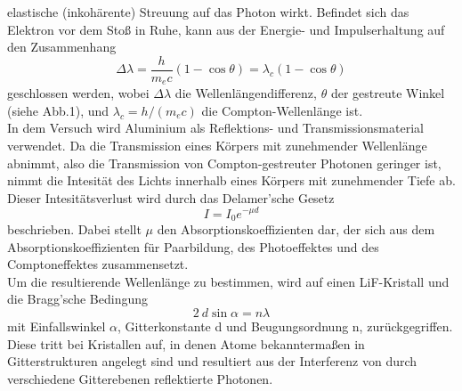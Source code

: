     elastische (inkohärente) Streuung auf das Photon wirkt. Befindet sich das Elektron 
    vor dem Stoß in Ruhe, kann aus der Energie- und Impulserhaltung auf den Zusammenhang
    \begin{equation*}
        \Delta \lambda = \dfrac{h}{m_e c}(1-\cos{\theta})=\lambda_c(1-\cos{\theta})
    \end{equation*}
    geschlossen werden, wobei $\Delta \lambda$ die Wellenlängendifferenz, $\theta$ der 
    gestreute Winkel (siehe Abb.1), und $\lambda_c=h/(m_e c)$ die Compton-Wellenlänge ist.\\
    In dem Versuch wird Aluminium als Reflektions- und Transmissionsmaterial verwendet.
    Da die Transmission eines Körpers mit zunehmender Wellenlänge abnimmt, also die Transmission
    von Compton-gestreuter Photonen geringer ist, nimmt die Intesität des Lichts innerhalb eines 
    Körpers mit zunehmender Tiefe ab. Dieser Intesitätsverlust wird durch das Delamer'sche Gesetz
    \begin{equation}
        I = I_0 e^{-\mu d}
    \end{equation}
    beschrieben. Dabei stellt $\mu$ den Absorptionskoeffizienten dar, der sich aus dem 
    Absorptionskoeffizienten für Paarbildung, des Photoeffektes und des Comptoneffektes 
    zusammensetzt.\\
    Um die resultierende Wellenlänge zu bestimmen, wird auf einen LiF-Kristall und die Bragg'sche Bedingung
    \begin{equation}
        2 \ d \sin{\alpha} = n\lambda
    \end{equation}
    mit Einfallswinkel $\alpha$, Gitterkonstante d und Beugungsordnung n, zurückgegriffen.
    Diese tritt bei Kristallen auf, in denen Atome bekanntermaßen in Gitterstrukturen 
    angelegt sind und resultiert aus der Interferenz von durch verschiedene Gitterebenen 
    reflektierte Photonen.

